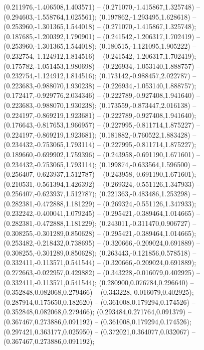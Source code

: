  (0.211976,-1.406508,1.403571) -- (0.271070,-1.415867,1.325748) -- (0.294603,-1.558764,1.025561);
 (0.197862,-1.293495,1.628618) -- (0.253960,-1.301365,1.544018) -- (0.271070,-1.415867,1.325748);
 (0.187685,-1.200392,1.790901) -- (0.241542,-1.206317,1.702419) -- (0.253960,-1.301365,1.544018);
 (0.180515,-1.121095,1.905222) -- (0.232754,-1.124912,1.814516) -- (0.241542,-1.206317,1.702419);
 (0.175782,-1.051453,1.980698) -- (0.226934,-1.053140,1.888757) -- (0.232754,-1.124912,1.814516);
 (0.173142,-0.988457,2.022787) -- (0.223683,-0.988070,1.930238) -- (0.226934,-1.053140,1.888757);
 (0.172417,-0.929776,2.034346) -- (0.222789,-0.927408,1.941640) -- (0.223683,-0.988070,1.930238);
 (0.173559,-0.873447,2.016138) -- (0.224197,-0.869219,1.923681) -- (0.222789,-0.927408,1.941640);
 (0.176643,-0.817653,1.966957) -- (0.227995,-0.811714,1.875227) -- (0.224197,-0.869219,1.923681);
 (0.181882,-0.760522,1.883428) -- (0.234432,-0.753065,1.793114) -- (0.227995,-0.811714,1.875227);
 (0.189660,-0.699902,1.759396) -- (0.243958,-0.691190,1.671601) -- (0.234432,-0.753065,1.793114);
 (0.199874,-0.633564,1.596500) -- (0.256407,-0.623937,1.512787) -- (0.243958,-0.691190,1.671601);
 (0.210531,-0.561394,1.426392) -- (0.269324,-0.551126,1.347933) -- (0.256407,-0.623937,1.512787);
 (0.221363,-0.483486,1.253298) -- (0.282381,-0.472888,1.181229) -- (0.269324,-0.551126,1.347933);
 (0.232242,-0.400041,1.079245) -- (0.295421,-0.389464,1.014665) -- (0.282381,-0.472888,1.181229);
 (0.243011,-0.311470,0.906727) -- (0.308255,-0.301289,0.850628) -- (0.295421,-0.389464,1.014665);
 (0.253482,-0.218432,0.738695) -- (0.320666,-0.209024,0.691889) -- (0.308255,-0.301289,0.850628);
 (0.263443,-0.121856,0.578518) -- (0.332411,-0.113571,0.541544) -- (0.320666,-0.209024,0.691889);
 (0.272663,-0.022957,0.429882) -- (0.343228,-0.016079,0.402925) -- (0.332411,-0.113571,0.541544);
 (0.280900,0.076784,0.296640) -- (0.352848,0.082068,0.279466) -- (0.343228,-0.016079,0.402925);
 (0.287914,0.175650,0.182620) -- (0.361008,0.179294,0.174526) -- (0.352848,0.082068,0.279466);
 (0.293484,0.271764,0.091379) -- (0.367467,0.273886,0.091192) -- (0.361008,0.179294,0.174526);
 (0.297421,0.363177,0.025950) -- (0.372021,0.364077,0.032067) -- (0.367467,0.273886,0.091192);
